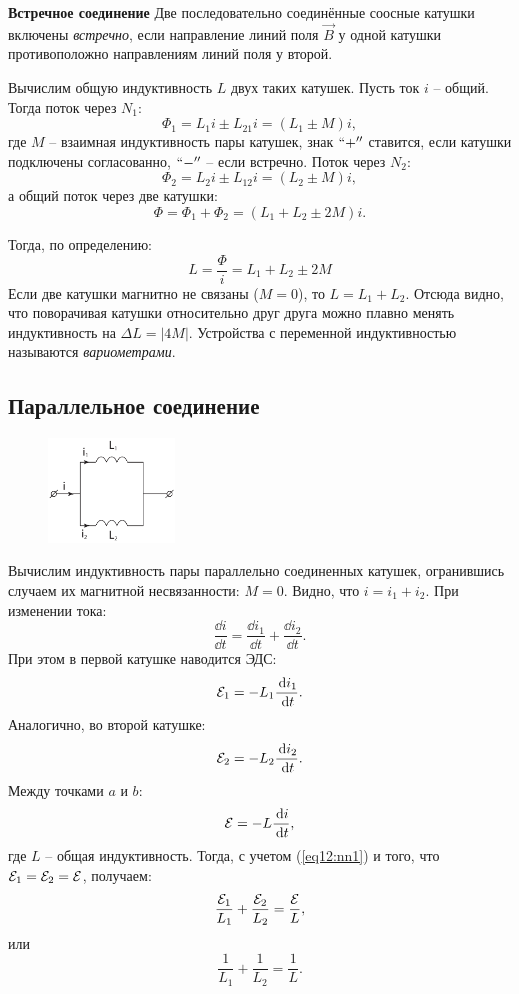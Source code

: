     \textbf{Встречное соединение}
    Две последовательно соединённые соосные катушки включены \textit{встречно},
    если направление линий поля \( \vec{B} \) у одной катушки противоположно
    направлениям линий поля у второй.
    
    Вычислим общую индуктивность \( L \) двух таких катушек. Пусть ток \( i \)
    -- общий. Тогда поток через \( N_1 \):
    \[
        \Phi_1 = L_1i \pm L_{21}i = (L_1 \pm M)i,
    \]
    где \( M \) -- взаимная индуктивность пары катушек, знак \( ``+'' \)
    ставится, если катушки подключены согласованно, \( ``-'' \) -- если
    встречно. Поток через \( N_2 \):
    \[
        \Phi_2 = L_2i \pm L_{12}i = (L_2 \pm M)i,
    \]
    а общий поток через две катушки:
    \[
        \Phi = \Phi_1 + \Phi_2 = (L_1 + L_2 \pm 2M)i.
    \]
    
    Тогда, по определению:
    \begin{equation}
        L = \frac{\Phi}{i} = L_1 + L_2 \pm 2M
    \end{equation}
    Если две катушки магнитно не связаны (\( M = 0 \)), то \( L = L_1 + L_2 \).
    Отсюда видно, что поворачивая катушки относительно друг друга можно плавно
    менять индуктивность на \( \Delta L = | 4M | \). Устройства с переменной
    индуктивностью называются \textit{вариометрами}.
    
    \subsection{Параллельное соединение}
    \begin{figure}[h]
        \center
        \includegraphics[width=0.3\textwidth]{lec12/parallel_coils.pdf}
    \end{figure}

    Вычислим индуктивность пары параллельно соединенных катушек, огранившись 
    случаем их магнитной несвязанности: \( M = 0 \). Видно, что \( i = i_1 + 
    i_2 \). При изменении тока:
    \begin{equation}
        \frac{\dd i}{\dd t} = \frac{\dd i_1}{\dd t} + \frac{\dd i_2}{\dd t}.
        \label{eq12:nn1}
    \end{equation}
    При этом в первой катушке наводится ЭДС:
    \[
        \mathcal{E}_1 = -L_1\frac{\,\mathrm{d}  i_1}{\,\mathrm{d}  t}.
    \]
    Аналогично, во второй катушке:
    \[
        \mathcal{E}_2 = -L_2\frac{\,\mathrm{d}  i_2}{\,\mathrm{d}  t}.
    \]
    Между точками \( a \) и \( b \):
    \[
        \mathcal{E} = -L\frac{\,\mathrm{d}  i}{\,\mathrm{d}  t},
    \]
    где \( L \) -- общая индуктивность. Тогда, с учетом (\ref{eq12:nn1}) и
    того, что \( \mathcal{E}_1 = \mathcal{E}_2 = \mathcal{E} \), получаем:
    \[
        \frac{\mathcal{E}_1}{L_1} + \frac{\mathcal{E}_2}{L_2} = \frac{\mathcal{E}}{L},
    \]
    или
    \begin{equation}
        \frac{1}{L_1} + \frac{1}{L_2} = \frac{1}{L}.
    \end{equation}
    
